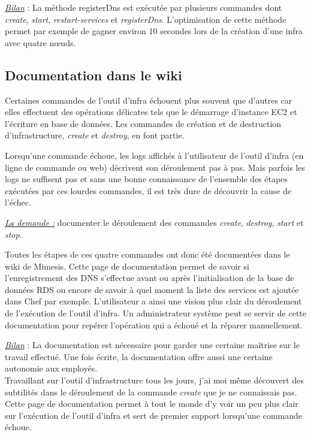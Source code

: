 \underline{\textit{Bilan}} : La méthode registerDns est exécutée par plusieurs commandes
dont \textit{create}, \textit{start}, \textit{restart-services} et
\textit{registerDns}. L'optimisation de cette méthode permet par exemple de
gagner environ 10 secondes lors de la création d'une infra avec quatre nœuds.

\subsection{Documentation dans le wiki}

Certaines commandes de l'outil d'infra échouent plus souvent que
d'autres car elles effectuent des opérations délicates tels que le démarrage
d'instance EC2 et l'écriture en base de données. Les commandes de création et de
destruction d'infrastructure, \textit{create} et \textit{destroy}, en font
partie.

Lorsqu'une commande échoue, les logs affichés à l'utilisateur de l'outil d'infra
(en ligne de commande ou web) décrivent son déroulement pas à pas. Mais parfois
les logs ne suffisent pas et sans une bonne connaissance de l'ensemble des
étapes exécutées par ces lourdes commandes, il est très dure de découvrir la
cause de l'échec.

\underline{\textit{La demande :}} documenter le déroulement des commandes \textit{create},
\textit{destroy}, \textit{start} et \textit{stop}.

Toutes les étapes de ces quatre commandes ont donc été documentées dans le wiki
de Mimesis. Cette page de documentation permet de savoir si l'enregistrement des
DNS s'effectue avant ou après l'initialisation de la base de données RDS ou
encore de savoir à quel moment la liste des services est ajoutée dans Chef par
exemple.
L'utilisateur a ainsi une vision plus clair du déroulement de l'exécution de
l'outil d'infra.
Un administrateur système peut se servir de cette documentation pour repérer
l'opération qui a échoué et la réparer manuellement.

\underline{\textit{Bilan}} : La documentation est nécessaire pour garder une certaine
maîtrise sur le travail effectué. Une fois écrite, la documentation offre aussi
une certaine autonomie aux employés. \\
Travaillant sur l'outil d'infrastructure tous les jours, j'ai moi même découvert
des subtilités dans le déroulement de la commande \textit{create} que je ne
connaissais pas. Cette page de documentation permet à tout le monde d'y voir
un peu plus clair sur l'exécution de l'outil d'infra et sert de premier support
lorsqu'une commande échoue.

